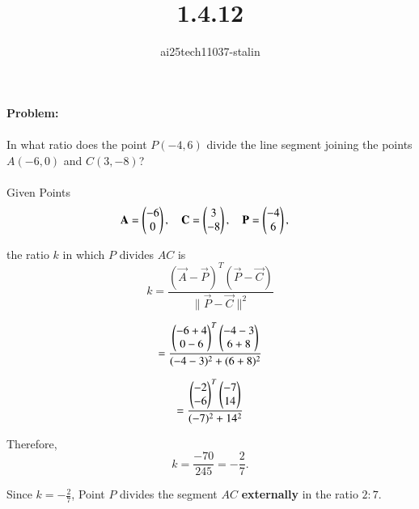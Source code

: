 \documentclass[journal]{IEEEtran}
\begin{document}

\vspace{3cm}

\title{1.4.12}
\author{ai25tech11037-stalin}
\maketitle
{\let\newpage\relax\maketitle}

\renewcommand{\thefigure}{\theenumi}
\renewcommand{\thetable}{\theenumi}
\setlength{\intextsep}{10pt} %

\renewcommand{\thetable}{\theenumi}

\textbf{Problem:} \\ 
\\
In what ratio does the point \( P(-4, 6) \) divide the line segment joining the points \( A(-6, 0) \) and \( C(3, -8) \)? 
\\

\solution\\

Given Points
\begin{align*}
\mathbf{A} &= \begin{pmatrix}-6 \\ 0\end{pmatrix}, \quad
\mathbf{C} =  \begin{pmatrix}3 \\ -8\end{pmatrix}, \quad
\mathbf{P} = \begin{pmatrix}-4 \\ 6\end{pmatrix},
\end{align*}

the ratio \( k \) in which \( P \) divides \( AC \) is
\[
k = \frac{(\vec{A} - \vec{P})^T (\vec{P} - \vec{C})}{\|\vec{P} - \vec{C}\|^2}
\]

\[
=\frac{
 \begin{pmatrix}-6 + 4 \\ 0 - 6\end{pmatrix}^T 
 \begin{pmatrix}-4 - 3 \\ 6 + 8\end{pmatrix}
}{
(-4 - 3)^2 + (6 + 8)^2
}
\]

\[
=\frac{
 \begin{pmatrix}-2 \\ -6\end{pmatrix}^T
 \begin{pmatrix}-7 \\ 14\end{pmatrix}
}{
(-7)^2 + 14^2
}
\]

Therefore,
\[
k = \frac{-70}{245} = -\frac{2}{7}.
\]

Since \( k = -\frac{2}{7} \), Point \( P \) divides the segment \( AC \) \textbf{externally} in the ratio \( 2 : 7 \).
\end{document}

